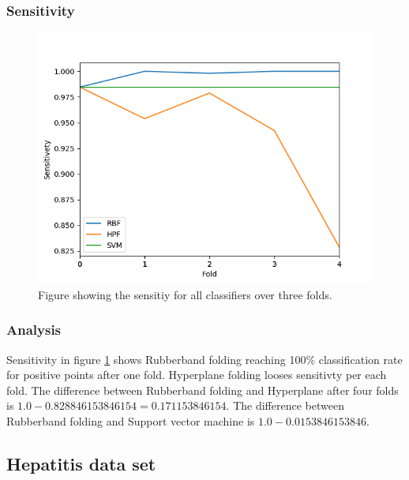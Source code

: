 \documentclass[a4paper,twoside]{bth}
\begin{document}
\clearpage
\FloatBarrier

\subsubsection{Sensitivity}
\begin{figure}[!htb]
\centering
\includegraphics[scale=0.7]{images/result-bmi/Sensitivety.png}
   \caption{Figure showing the sensitiy for all classifiers over three folds.}
   \label{fig:bmi-Sensitivity}
\end{figure}

\FloatBarrier

\subsubsection{Analysis}
Sensitivity in figure \ref{fig:bmi-Sensitivity} shows Rubberband folding reaching 100\% classification rate for positive points after one fold. Hyperplane folding looses sensitivty per each fold. The difference between Rubberband folding and Hyperplane after four folds is $1.0 - 0.828846153846154 = 0.171153846154$. The difference between Rubberband folding and Support vector machine is $1.0 - 0.0153846153846$.

\clearpage

\subsection{Hepatitis data set}

\FloatBarrier
\end{document}
